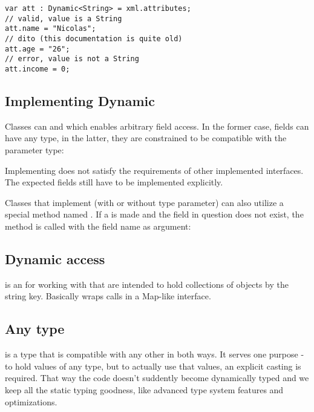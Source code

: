 \begin{lstlisting}
var att : Dynamic<String> = xml.attributes;
// valid, value is a String
att.name = "Nicolas";
// dito (this documentation is quite old)
att.age = "26";
// error, value is not a String
att.income = 0;
\end{lstlisting}

\subsection{Implementing Dynamic}
\label{types-dynamic-implemented}

Classes can   and  which enables arbitrary field access. In the former case, fields can have any type, in the latter, they are constrained to be compatible with the parameter type:


Implementing  does not satisfy the requirements of other implemented interfaces. The expected fields still have to be implemented explicitly.

Classes that implement  (with or without type parameter) can also utilize a special method named . If a  is made and the field in question does not exist, the  method is called with the field name as argument:



\subsection{Dynamic access}
\label{types-dynamic-access}

 is an  for working with  that are intended to hold collections of objects by the string key. Basically  wraps  calls in a Map-like interface.


\subsection{Any type}
\label{types-dynamic-any}

 is a type that is compatible with any other in both ways. 
It serves one purpose - to hold values of any type, but to actually use that values, an explicit casting is required. That way the code doesn't suddently become dynamically typed and we keep all the static typing goodness, like advanced type system features and optimizations.

